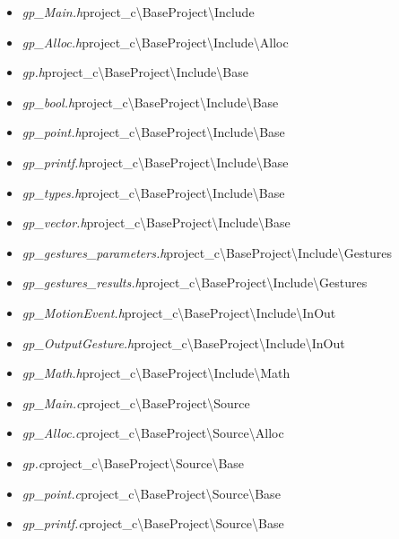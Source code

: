 \begin{itemize}
\item \textit{gp_Main.h}\quad project_c\textbackslash BaseProject\textbackslash Include
\item \textit{gp_Alloc.h}\quad project_c\textbackslash BaseProject\textbackslash Include\textbackslash Alloc
\item \textit{gp.h}\quad project_c\textbackslash BaseProject\textbackslash Include\textbackslash Base
\item \textit{gp_bool.h}\quad project_c\textbackslash BaseProject\textbackslash Include\textbackslash Base
\item \textit{gp_point.h}\quad project_c\textbackslash BaseProject\textbackslash Include\textbackslash Base
\item \textit{gp_printf.h}\quad project_c\textbackslash BaseProject\textbackslash Include\textbackslash Base
\item \textit{gp_types.h}\quad project_c\textbackslash BaseProject\textbackslash Include\textbackslash Base
\item \textit{gp_vector.h}\quad project_c\textbackslash BaseProject\textbackslash Include\textbackslash Base
\item \textit{gp_gestures_parameters.h}\quad project_c\textbackslash BaseProject\textbackslash Include\textbackslash Gestures
\item \textit{gp_gestures_results.h}\quad project_c\textbackslash BaseProject\textbackslash Include\textbackslash Gestures
\item \textit{gp_MotionEvent.h}\quad project_c\textbackslash BaseProject\textbackslash Include\textbackslash InOut
\item \textit{gp_OutputGesture.h}\quad project_c\textbackslash BaseProject\textbackslash Include\textbackslash InOut
\item \textit{gp_Math.h}\quad project_c\textbackslash BaseProject\textbackslash Include\textbackslash Math
\item \textit{gp_Main.c}\quad project_c\textbackslash BaseProject\textbackslash Source
\item \textit{gp_Alloc.c}\quad project_c\textbackslash BaseProject\textbackslash Source\textbackslash Alloc
\item \textit{gp.c}\quad project_c\textbackslash BaseProject\textbackslash Source\textbackslash Base
\item \textit{gp_point.c}\quad project_c\textbackslash BaseProject\textbackslash Source\textbackslash Base
\item \textit{gp_printf.c}\quad project_c\textbackslash BaseProject\textbackslash Source\textbackslash Base

\end{itemize}
